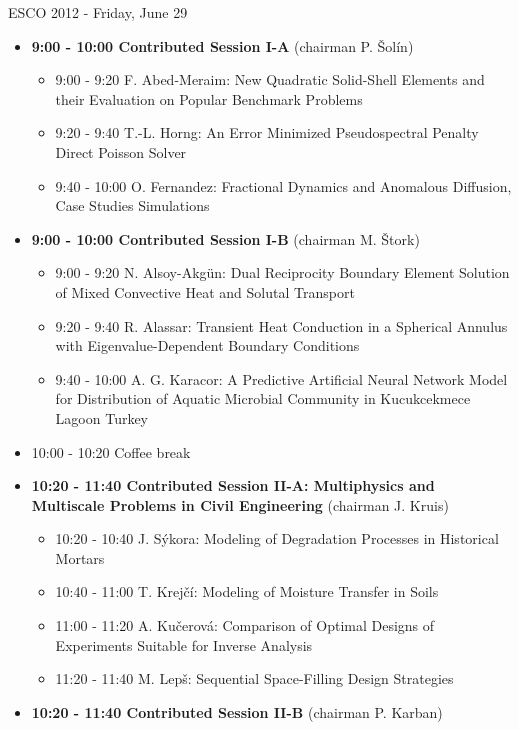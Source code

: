 \documentclass[10pt, A4]{article}%
\begin{document}
\centerline{\huge ESCO 2012 - Friday, June 29}
\vspace{4mm}
\begin{itemize}    
  \item {\bf 9:00 - 10:00 Contributed Session I-A} (chairman P. \v{S}ol\'{i}n) 
  \begin{itemize}
    \item 9:00 - 9:20 F. Abed-Meraim: New Quadratic Solid-Shell Elements and their Evaluation on Popular Benchmark Problems
    \item 9:20 - 9:40 T.-L. Horng: An Error Minimized Pseudospectral Penalty Direct Poisson Solver
    \item 9:40 - 10:00 O. Fernandez: Fractional Dynamics and Anomalous Diffusion, Case Studies Simulations
  \end{itemize}
  \item {\bf 9:00 - 10:00 Contributed Session I-B} (chairman M. \v{S}tork) 
  \begin{itemize}
    \item 9:00 - 9:20 N. Alsoy-Akg\"{u}n: Dual Reciprocity Boundary Element Solution of Mixed Convective Heat and Solutal Transport
    \item 9:20 - 9:40 R. Alassar: Transient Heat Conduction in a Spherical Annulus with Eigenvalue-Dependent Boundary Conditions
    \item 9:40 - 10:00 A. G. Karacor: A Predictive Artificial Neural Network Model for Distribution of Aquatic Microbial Community in Kucukcekmece Lagoon Turkey
  \end{itemize}
  \item 10:00 - 10:20 Coffee break
  \item {\bf 10:20 - 11:40 Contributed Session II-A: Multiphysics and Multiscale Problems in Civil Engineering} (chairman J. Kruis) 
  \begin{itemize}
    \item 10:20 - 10:40 J. S\'{y}kora: Modeling of Degradation Processes in Historical Mortars
    \item 10:40 - 11:00 T. Krej\v{c}\'{i}: Modeling of Moisture Transfer in Soils
    \item 11:00 - 11:20 A. Ku\v{c}erov\'{a}: Comparison of Optimal Designs of Experiments Suitable for Inverse Analysis
    \item 11:20 - 11:40 M. Lep\v{s}: Sequential Space-Filling Design Strategies
  \end{itemize}
    \item {\bf 10:20 - 11:40 Contributed Session II-B} (chairman P. Karban) 

\end{itemize}
\end{document}
